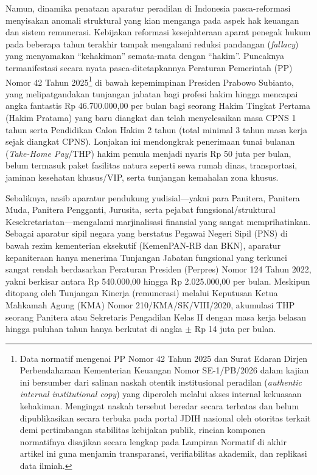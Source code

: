 \documentclass[12pt, a4paper]{article}
\begin{document}
Namun, dinamika penataan aparatur peradilan di Indonesia pasca-reformasi menyisakan anomali struktural yang kian menganga pada aspek hak keuangan dan sistem remunerasi. Kebijakan reformasi kesejahteraan aparat penegak hukum pada beberapa tahun terakhir tampak mengalami reduksi pandangan (\textit{fallacy}) yang menyamakan ``kehakiman'' semata-mata dengan ``hakim''. Puncaknya termanifestasi secara nyata pasca-ditetapkannya Peraturan Pemerintah (PP) Nomor 42 Tahun 2025\footnote{Data normatif mengenai PP Nomor 42 Tahun 2025 dan Surat Edaran Dirjen Perbendaharaan Kementerian Keuangan Nomor SE-1/PB/2026 dalam kajian ini bersumber dari salinan naskah otentik institusional peradilan (\textit{authentic internal institutional copy}) yang diperoleh melalui akses internal kekuasaan kehakiman. Mengingat naskah tersebut beredar secara terbatas dan belum dipublikasikan secara terbuka pada portal JDIH nasional oleh otoritas terkait demi pertimbangan stabilitas kebijakan publik, rincian komponen normatifnya disajikan secara lengkap pada Lampiran Normatif di akhir artikel ini guna menjamin transparansi, verifiabilitas akademik, dan replikasi data ilmiah.} di bawah kepemimpinan Presiden Prabowo Subianto, yang melipatgandakan tunjangan jabatan bagi profesi hakim hingga mencapai angka fantastis Rp 46.700.000,00 per bulan bagi seorang Hakim Tingkat Pertama (Hakim Pratama) yang baru diangkat dan telah menyelesaikan masa CPNS 1 tahun serta Pendidikan Calon Hakim 2 tahun (total minimal 3 tahun masa kerja sejak diangkat CPNS). Lonjakan ini mendongkrak penerimaan tunai bulanan (\textit{Take-Home Pay}/THP) hakim pemula menjadi nyaris Rp 50 juta per bulan, belum termasuk paket fasilitas natura seperti sewa rumah dinas, transportasi, jaminan kesehatan khusus/VIP, serta tunjangan kemahalan zona khusus.

Sebaliknya, nasib aparatur pendukung yudisial---yakni para Panitera, Panitera Muda, Panitera Pengganti, Jurusita, serta pejabat fungsional/struktural Kesekretariatan---mengalami marjinalisasi finansial yang sangat memprihatinkan. Sebagai aparatur sipil negara yang berstatus Pegawai Negeri Sipil (PNS) di bawah rezim kementerian eksekutif (KemenPAN-RB dan BKN), aparatur kepaniteraan hanya menerima Tunjangan Jabatan fungsional yang terkunci sangat rendah berdasarkan Peraturan Presiden (Perpres) Nomor 124 Tahun 2022, yakni berkisar antara Rp 540.000,00 hingga Rp 2.025.000,00 per bulan. Meskipun ditopang oleh Tunjangan Kinerja (remunerasi) melalui Keputusan Ketua Mahkamah Agung (KMA) Nomor 210/KMA/SK/VIII/2020, akumulasi THP seorang Panitera atau Sekretaris Pengadilan Kelas II dengan masa kerja belasan hingga puluhan tahun hanya berkutat di angka $\pm$ Rp 14 juta per bulan. 
\end{document}

